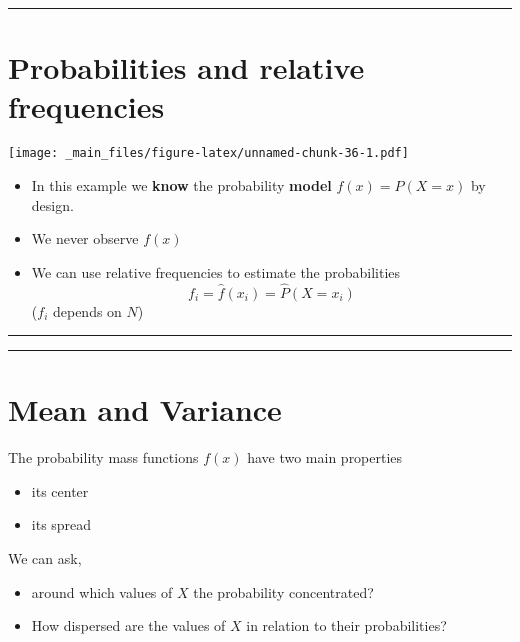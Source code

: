 \documentclass[
]{book}
\providecommand{\tightlist}{%
  \setlength{\itemsep}{0pt}\setlength{\parskip}{0pt}}
\begin{document}
\begin{center}\rule{0.5\linewidth}{0.5pt}\end{center}

\hypertarget{probabilities-and-relative-frequencies}{%
\section{Probabilities and relative frequencies}\label{probabilities-and-relative-frequencies}}

\texttt{[image: \_main\_files/figure-latex/unnamed-chunk-36-1.pdf]}

\begin{itemize}
\tightlist
\item
  In this example we \textbf{know} the probability \textbf{model} \(f(x)=P(X=x)\) by design.
\item
  We never observe \(f(x)\)
\item
  We can use relative frequencies to estimate the probabilities
  \[f_i = \hat{f}(x_i)=\hat{P}(X=x_i)\] (\(f_i\) depends on \(N\))
\end{itemize}

\begin{center}\rule{0.5\linewidth}{0.5pt}\end{center}

\begin{center}\rule{0.5\linewidth}{0.5pt}\end{center}

\hypertarget{mean-and-variance}{%
\section{Mean and Variance}\label{mean-and-variance}}

The probability mass functions \(f(x)\) have two main properties

\begin{itemize}
\tightlist
\item
  its center
\item
  its spread
\end{itemize}

We can ask,

\begin{itemize}
\item
  around which values of \(X\) the probability concentrated?
\item
  How dispersed are the values of \(X\) in relation to their probabilities?
\end{itemize}
\end{document}
